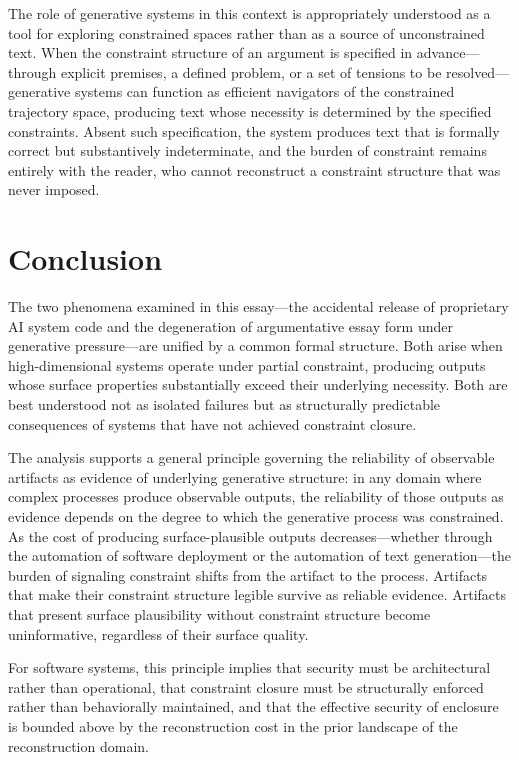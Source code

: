\documentclass[12pt, oneside]{article}
\theoremstyle{plain}
\theoremstyle{definition}
\theoremstyle{remark}
\begin{document}
The role of generative systems in this context is appropriately understood as a tool for
exploring constrained spaces rather than as a source of unconstrained text. When the
constraint structure of an argument is specified in advance---through explicit premises,
a defined problem, or a set of tensions to be resolved---generative systems can function
as efficient navigators of the constrained trajectory space, producing text whose necessity
is determined by the specified constraints. Absent such specification, the system produces
text that is formally correct but substantively indeterminate, and the burden of constraint
remains entirely with the reader, who cannot reconstruct a constraint structure that was
never imposed.

\section{Conclusion}

The two phenomena examined in this essay---the accidental release of proprietary AI system
code and the degeneration of argumentative essay form under generative pressure---are unified
by a common formal structure. Both arise when high-dimensional systems operate under partial
constraint, producing outputs whose surface properties substantially exceed their underlying
necessity. Both are best understood not as isolated failures but as structurally predictable
consequences of systems that have not achieved constraint closure.

The analysis supports a general principle governing the reliability of observable artifacts
as evidence of underlying generative structure: in any domain where complex processes
produce observable outputs, the reliability of those outputs as evidence depends on the
degree to which the generative process was constrained. As the cost of producing
surface-plausible outputs decreases---whether through the automation of software deployment
or the automation of text generation---the burden of signaling constraint shifts from the
artifact to the process. Artifacts that make their constraint structure legible survive as
reliable evidence. Artifacts that present surface plausibility without constraint structure
become uninformative, regardless of their surface quality.

For software systems, this principle implies that security must be architectural rather than
operational, that constraint closure must be structurally enforced rather than behaviorally
maintained, and that the effective security of enclosure is bounded above by the
reconstruction cost in the prior landscape of the reconstruction domain.
\end{document}
